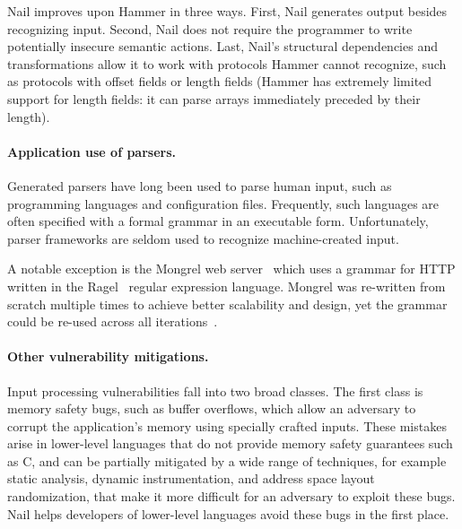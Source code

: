 Nail improves upon Hammer in three ways. First, Nail  generates output besides recognizing input.
Second, Nail does not require the programmer to write potentially insecure semantic actions. Last,
Nail's structural dependencies and transformations allow it to work with protocols Hammer cannot recognize, such as
protocols with offset fields or length fields (Hammer has extremely limited support for length
fields: it can parse arrays immediately preceded by their length).


\paragraph{Application use of parsers.}
Generated parsers have long been used to parse human input, such as programming languages and
configuration files. Frequently, such languages are often specified with a formal grammar in an
executable form. Unfortunately,  parser frameworks are seldom used  to recognize
machine-created input.

A notable exception is the Mongrel
web server~\cite{mongrel} which uses a grammar
for HTTP written in the Ragel~\cite{ragel-paper} regular expression
language. Mongrel was re-written from scratch multiple times to achieve
better scalability and design, yet the grammar could be  re-used across
all iterations~\cite{patterson-citation}.

\paragraph{Other vulnerability mitigations.}

Input processing vulnerabilities fall into two broad classes.  The first
class is memory safety bugs, such as buffer overflows, which allow an
adversary to corrupt the application's memory using specially crafted
inputs.  These mistakes arise in lower-level languages that do not
provide memory safety guarantees such as C, and can be partially
mitigated by a wide range of techniques, for example static analysis,
dynamic instrumentation, and address space layout randomization, that
make it more difficult for an adversary to exploit these bugs.
Nail helps developers of lower-level languages avoid these bugs
in the first place.

